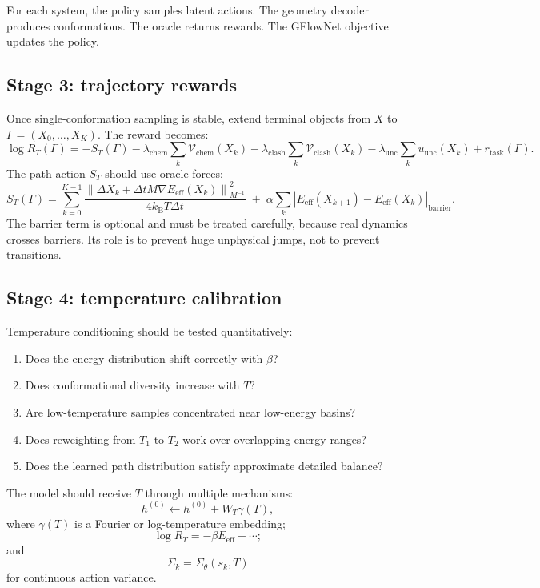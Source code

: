 \documentclass[11pt]{article}
\newcommand{\Kb}{k_{\mathrm B}}
\begin{document}
For each system, the policy samples latent actions. The geometry decoder produces conformations. The oracle returns rewards. The GFlowNet objective updates the policy.

\subsection{Stage 3: trajectory rewards}

Once single-conformation sampling is stable, extend terminal objects from $X$ to $\Gamma=(X_0,\dots,X_K)$. The reward becomes:
\[
\log R_T(\Gamma)
=
-S_T(\Gamma)
-\lambda_{\mathrm{chem}}\sum_k \mathcal{V}_{\mathrm{chem}}(X_k)
-\lambda_{\mathrm{clash}}\sum_k \mathcal{V}_{\mathrm{clash}}(X_k)
-\lambda_{\mathrm{unc}}\sum_k u_{\mathrm{unc}}(X_k)
+r_{\mathrm{task}}(\Gamma).
\]
The path action $S_T$ should use oracle forces:
\[
S_T(\Gamma)=
\sum_{k=0}^{K-1}
\frac{
\left\|\Delta X_k+\Delta t M\nabla E_{\mathrm{eff}}(X_k)\right\|^2_{M^{-1}}
}{
4\Kb T\Delta t
}
\;+\;\alpha \sum_k \left|E_{\mathrm{eff}}(X_{k+1})-E_{\mathrm{eff}}(X_k)\right|_{\mathrm{barrier}}.
\]
The barrier term is optional and must be treated carefully, because real dynamics crosses barriers. Its role is to prevent huge unphysical jumps, not to prevent transitions.

\subsection{Stage 4: temperature calibration}

Temperature conditioning should be tested quantitatively:
\begin{enumerate}[leftmargin=2em]
  \item Does the energy distribution shift correctly with $\beta$?
  \item Does conformational diversity increase with $T$?
  \item Are low-temperature samples concentrated near low-energy basins?
  \item Does reweighting from $T_1$ to $T_2$ work over overlapping energy ranges?
  \item Does the learned path distribution satisfy approximate detailed balance?
\end{enumerate}

The model should receive $T$ through multiple mechanisms:
\[
h^{(0)}\leftarrow h^{(0)}+W_T\gamma(T),
\]
where $\gamma(T)$ is a Fourier or log-temperature embedding;
\[
\log R_T=-\beta E_{\mathrm{eff}}+\cdots;
\]
and
\[
\Sigma_k=\Sigma_\theta(s_k,T)
\]
for continuous action variance.
\end{document}
